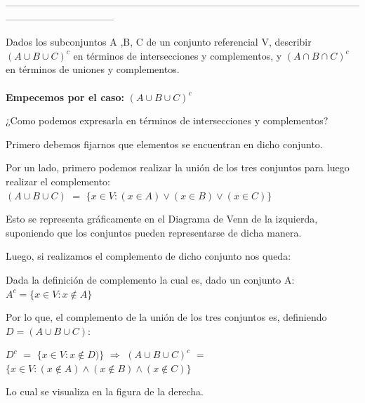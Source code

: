 \documentclass[10pt]{article}
\begin{document}
---------------------------------------------------------------------------------------------------------------------------------------------
\begin{ej}
Dados los subconjuntos A ,B, C de un conjunto referencial V, describir $(A \cup B \cup C)^c$ en términos de intersecciones y complementos, y $(A \cap B \cap C)^c$ en términos de uniones y complementos.
\\\\
\sffamily
\textbf{Empecemos por el caso:} $(A \cup B \cup C)^c$

¿Como podemos expresarla en términos de intersecciones y complementos?

Primero debemos fijarnos que elementos se encuentran en dicho conjunto.

Por un lado, primero podemos realizar la unión de los tres conjuntos para luego realizar el complemento:
\\
$(A \cup B \cup C)$ $=$ $\{ x \in V : (x \in A) \lor (x \in B) \lor (x \in C) \}$

Esto se representa gráficamente en el Diagrama de Venn de la izquierda, suponiendo que los conjuntos pueden representarse de dicha manera.

Luego, si realizamos el complemento de dicho conjunto nos queda:

Dada la definición de complemento la cual es, dado un conjunto A: \textcolor{B}{$A^c = \{ x \in V : x \not\in A\}$}

Por lo que, el complemento de la unión de los tres conjuntos es, definiendo $D = (A \cup B \cup C)$:

$D^c$ $=$ $\{ x \in V : x \not\in D) \}$ $\Rightarrow$  \textcolor{B}{$(A \cup B \cup C)^c$ $=$ $\{ x \in V : (x \not\in A) \land (x \not\in B) \land (x \not\in C) \}$}

Lo cual se visualiza en la figura de la derecha.
\begin{figure}[H]
	\begin{minipage}[b]{0.5\linewidth}
		\centering
\end{minipage}
\end{figure}
\end{ej}
\end{document}
